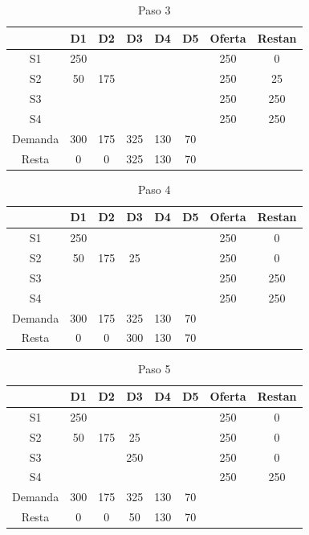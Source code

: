 \documentclass[12pt]{article}  %
\begin{document}
\begin{table}[H]
        \centering
        \caption{Paso 3}
        \label{tab:paso3Prob3}
        \begin{tabular}{c|ccccc|cc}
        & D1 & D2 & D3 & D4 & D5 & Oferta & Restan \\
        \hline
        S1 & 250 &  &  &  &  & 250 & 0 \\
        S2 &  50 & \cellcolor{yellow} 175 &  &  &  & 250 & 25 \\
        S3 &  &  &  &  &  & 250 & 250 \\
        S4 &  &  &  &  &  & 250 & 250 \\
        \hline
        Demanda & 300 & 175 & 325 & 130 & 70 & & \\
        Resta & 0 & 0 & 325 & 130 & 70 & & \\
        \end{tabular}
\end{table}

\begin{table}[H]
        \centering
        \caption{Paso 4}
        \label{tab:paso4Prob3}
        \begin{tabular}{c|ccccc|cc}
        & D1 & D2 & D3 & D4 & D5 & Oferta & Restan \\
        \hline
        S1 & 250 &  &  &  &  & 250 & 0 \\
        S2 &  50 & 175 & \cellcolor{yellow} 25 &  &  & 250 & 0 \\
        S3 &  &  &  &  &  & 250 & 250 \\
        S4 &  &  &  &  &  & 250 & 250 \\
        \hline
        Demanda & 300 & 175 & 325 & 130 & 70 & & \\
        Resta & 0 & 0 & 300 & 130 & 70 & & \\
        \end{tabular}
\end{table}

\begin{table}[H]
        \centering
        \caption{Paso 5}
        \label{tab:paso5Prob3}
        \begin{tabular}{c|ccccc|cc}
        & D1 & D2 & D3 & D4 & D5 & Oferta & Restan \\
        \hline
        S1 & 250 &  &  &  &  & 250 & 0 \\
        S2 &  50 & 175 & 25 &  &  & 250 & 0 \\
        S3 &  &  & \cellcolor{yellow} 250 &  &    & 250 & 0 \\
        S4 &  &  &  &  &  & 250 & 250 \\
        \hline
        Demanda & 300 & 175 & 325 & 130 & 70 & & \\
        Resta & 0 & 0 & 50 & 130 & 70 & & \\
        \end{tabular}
\end{table}
\end{document}
